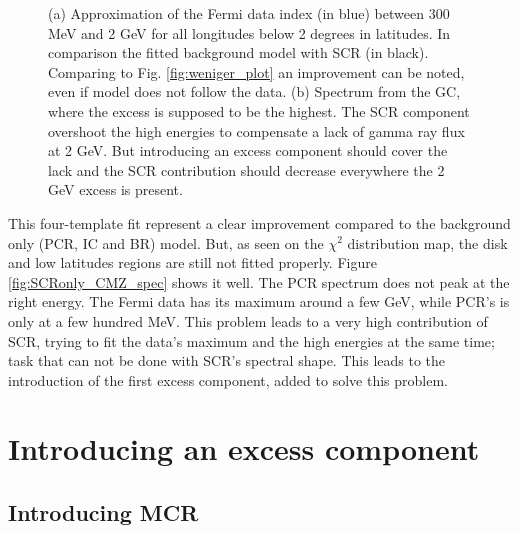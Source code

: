 \begin{figure}[h]
\begin{minipage}[h]{0.45\textwidth}
	  \subcaption{}
	  \label{fig:SCRonly_CMZ_spec}
  \end{minipage}	 
  \caption{(a) Approximation of the Fermi data index (in blue) between 300 MeV and 2 GeV for all longitudes below 2 degrees in latitudes. In comparison the fitted background model with SCR (in black). Comparing to Fig. \ref{fig:weniger_plot} an improvement can be noted, even if model does not follow the data. (b) Spectrum from the GC, where the excess is supposed to be the highest. The SCR component overshoot the high energies to compensate a lack of gamma ray flux at 2 GeV. But introducing an excess component should cover the lack and the SCR contribution should decrease everywhere the 2 GeV excess is present.}
	  \label{fig:SCRonly_BKGonly_spec_comp}
\end{figure}


This four-template fit represent a clear improvement compared to the background only (PCR, IC and BR) model. But, as seen on the $\chi^2$ distribution map, the disk and low latitudes regions are still not fitted properly. Figure \ref{fig:SCRonly_CMZ_spec} shows it well. The PCR spectrum does not peak at the right energy. The Fermi data has its maximum around a few GeV, while PCR's is only at a few hundred MeV. This problem leads to a very high contribution of SCR, trying to fit the data's maximum and the high energies at the same time; task that can not be done with SCR's spectral shape.
This leads to the introduction of the first excess component, added to solve this problem.







\newpage
\section{Introducing an excess component}
\subsection{Introducing MCR}

